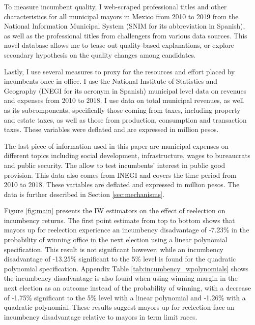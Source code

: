 \documentclass[12pt]{amsart}
\makeatletter
\def\section{\@startsection{section}{1}
	\z@{1.0\linespacing\@plus\linespacing}{.5\linespacing}{\Large}}
\numberwithin{equation}{section}
\theoremstyle{definition}
\theoremstyle{definition}
\theoremstyle{definition}
\makeatother
\begin{document}
To measure incumbent quality, I web-scraped professional titles and other characteristics for all municipal mayors in Mexico from 2010 to 2019 from the National Information Municipal System (SNIM for its abbreviation in Spanish), as well as the professional titles from challengers from various data sources. This novel database allows me to tease out quality-based explanations, or explore secondary hypothesis on the quality changes among candidates.

Lastly, I use several measures to proxy for the resources and effort placed by incumbents once in office. I use the National Institute of Statistics and Geography (INEGI for its acronym in Spanish) municipal level data on revenues and expenses from 2010 to 2018. I use data on total municipal revenues, as well as its subcomponents, specifically those coming from taxes, including property and estate taxes, as well as those from production, consumption and transaction taxes. These variables were deflated and are expressed in million pesos. 

The last piece of information used in this paper are municipal expenses on different topics including social development, infrastructure, wages to bureaucrats and public security. The allow to test incumbents' interest in public good provision. This data also comes from INEGI and covers the time period from 2010 to 2018. These variables are deflated and expressed in million pesos. The data is further described in Section \ref{sec:mechanisms}.

\section{Main Results \label{sec:results}}

Figure \ref{fig:main} presents the IW estimators on the effect of reelection on incumbency returns. The first point estimate from top to bottom shows that mayors up for reelection experience an incumbency disadvantage of -7.23\% in the probability of winning office in the next election using a linear polynomial specification. This result is not significant however, while an incumbency disadvantage of -13.25\% significant to the 5\% level is found for the quadratic polynomial specification. Appendix Table \ref{tab:incumbency_wpolynomials} shows the incumbency disadvantage is also found when using winning margin in the next election as an outcome instead of the probability of winning, with a decrease of -1.75\% significant to the 5\% level with a linear polynomial and -1.26\% with a quadratic polynomial. These results suggest mayors up for reelection face an incumbency disadvantage relative to mayors in term limit races.   
\end{document}
